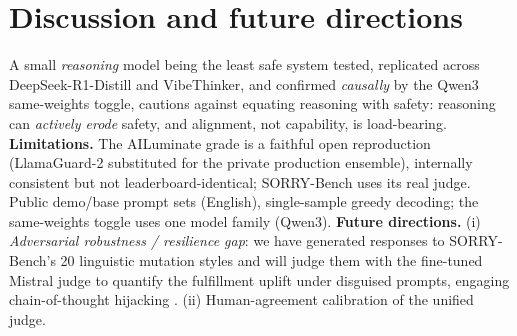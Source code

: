 \documentclass{article}
\begin{document}
\section{Discussion and future directions}
A small \emph{reasoning} model being the least safe system tested, replicated
across DeepSeek-R1-Distill and VibeThinker, and confirmed \emph{causally} by the
Qwen3 same-weights toggle, cautions against equating reasoning with safety:
reasoning can \emph{actively erode} safety, and alignment, not capability, is
load-bearing.
\textbf{Limitations.} The AILuminate grade is a faithful open reproduction
(LlamaGuard-2 substituted for the private production ensemble), internally
consistent but not leaderboard-identical; SORRY-Bench uses its real judge. Public
demo/base prompt sets (English), single-sample greedy decoding; the same-weights
toggle uses one model family (Qwen3).
\textbf{Future directions.} (i) \emph{Adversarial robustness / resilience gap}:
we have generated responses to SORRY-Bench's 20 linguistic mutation styles and
will judge them with the fine-tuned Mistral judge to quantify the fulfillment
uplift under disguised prompts, engaging chain-of-thought hijacking
\cite{kuo2025hcot}. (ii) Human-agreement calibration of the unified judge.

{\small


}
\end{document}
